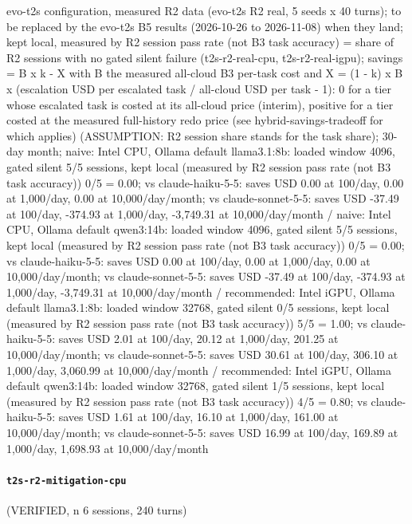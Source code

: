 {\footnotesize\raggedright evo-t2s configuration, measured R2 data (evo-t2s R2 real, 5 seeds x 40 turns); to be replaced by the evo-t2s B5 results (2026-10-26 to 2026-11-08) when they land; kept local, measured by R2 session pass rate (not B3 task accuracy) = share of R2 sessions with no gated silent failure (t2s-r2-real-cpu, t2s-r2-real-igpu); savings = B x k - X with B the measured all-cloud B3 per-task cost and X = (1 - k) x B x (escalation USD per escalated task / all-cloud USD per task - 1): 0 for a tier whose escalated task is costed at its all-cloud price (interim), positive for a tier costed at the measured full-history redo price (see hybrid-savings-tradeoff for which applies) (ASSUMPTION: R2 session share stands for the task share); 30-day month; naive: Intel CPU, Ollama default llama3.1:8b: loaded window 4096, gated silent 5/5 sessions, kept local (measured by R2 session pass rate (not B3 task accuracy)) 0/5 = 0.00; vs claude-haiku-5-5: saves USD 0.00 at 100/day, 0.00 at 1,000/day, 0.00 at 10,000/day/month; vs claude-sonnet-5-5: saves USD -37.49 at 100/day, -374.93 at 1,000/day, -3,749.31 at 10,000/day/month / naive: Intel CPU, Ollama default qwen3:14b: loaded window 4096, gated silent 5/5 sessions, kept local (measured by R2 session pass rate (not B3 task accuracy)) 0/5 = 0.00; vs claude-haiku-5-5: saves USD 0.00 at 100/day, 0.00 at 1,000/day, 0.00 at 10,000/day/month; vs claude-sonnet-5-5: saves USD -37.49 at 100/day, -374.93 at 1,000/day, -3,749.31 at 10,000/day/month / recommended: Intel iGPU, Ollama default llama3.1:8b: loaded window 32768, gated silent 0/5 sessions, kept local (measured by R2 session pass rate (not B3 task accuracy)) 5/5 = 1.00; vs claude-haiku-5-5: saves USD 2.01 at 100/day, 20.12 at 1,000/day, 201.25 at 10,000/day/month; vs claude-sonnet-5-5: saves USD 30.61 at 100/day, 306.10 at 1,000/day, 3,060.99 at 10,000/day/month / recommended: Intel iGPU, Ollama default qwen3:14b: loaded window 32768, gated silent 1/5 sessions, kept local (measured by R2 session pass rate (not B3 task accuracy)) 4/5 = 0.80; vs claude-haiku-5-5: saves USD 1.61 at 100/day, 16.10 at 1,000/day, 161.00 at 10,000/day/month; vs claude-sonnet-5-5: saves USD 16.99 at 100/day, 169.89 at 1,000/day, 1,698.93 at 10,000/day/month\par}

\paragraph{\texttt{t2s-r2-mitigation-cpu}} (VERIFIED, n 6 sessions, 240 turns)

